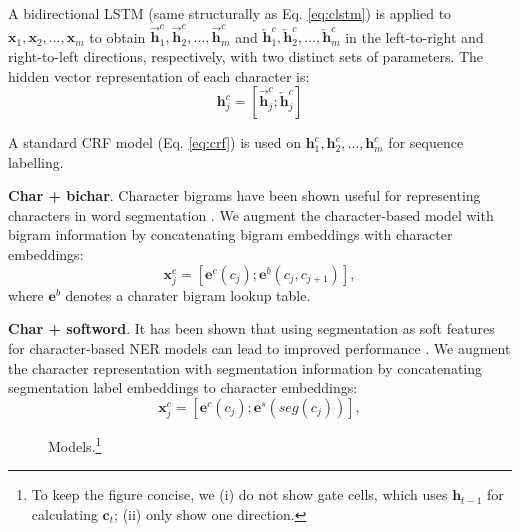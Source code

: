 \documentclass[11pt,a4paper]{article}
\begin{document}
\begin{CJK*}{UTF8}{gbsn}
A bidirectional LSTM (same structurally as Eq. \ref{eq:clstm}) is applied to $\textbf{x}_1, \textbf{x}_2, \ldots, \textbf{x}_m$ to obtain $\overrightarrow{\textbf{h}}^c_1, \overrightarrow{\textbf{h}}^c_2, \ldots, \overrightarrow{\textbf{h}}^c_m$ and $\overleftarrow{\textbf{h}}^c_1, \overleftarrow{\textbf{h}}^c_2, \ldots, \overleftarrow{\textbf{h}}^c_m$ in the left-to-right and right-to-left directions, respectively, with two distinct sets of parameters. The hidden vector representation of each character is:
\begin{equation}
\textbf{h}^c_j = [\overrightarrow{\textbf{h}}^c_j;\overleftarrow{\textbf{h}}^c_j]
\end{equation}

A standard CRF model (Eq. \ref{eq:crf}) is used on $\textbf{h}^c_1, \textbf{h}^c_2,\ldots,\textbf{h}^c_m$ for sequence labelling. 



\noindent \textbullet \; \textbf{Char + bichar}. Character bigrams have been shown useful for representing characters in word segmentation \cite{chen-EtAl:2015:EMNLP2,yang-zhang-dong:2017:Long}. We augment the character-based model with bigram information by concatenating bigram embeddings with character embeddings:
\begin{equation}
\textbf{x}^c_j=[\textbf{e}^c(c_j); \textbf{e}^b(c_j, c_{j+1})],
\end{equation}
where $\textbf{e}^b$ denotes a charater bigram lookup table.

\noindent \textbullet \; \textbf{Char + softword}. It has been shown that using segmentation as soft features for character-based NER models can lead to improved performance \cite{zhao2008unsupervised,peng2016improving}. We augment the character representation with segmentation information by concatenating segmentation label embeddings to character embeddings:
\begin{equation}
\textbf{x}^c_j = [\textbf{e}^c(c_j); \textbf{e}^s(\textit{seg}(c_j))],
\end{equation}

\begin{figure}[!t]
  \centering 
  \caption{Models.\footnote{To keep the figure concise, we (i) do not show gate cells, which uses $\textbf{h}_{t-1}$ for calculating $\textbf{c}_t$; (ii) only show one direction.}} 
  \label{fig:models} \end{figure}


\end{CJK*}
\end{document}
